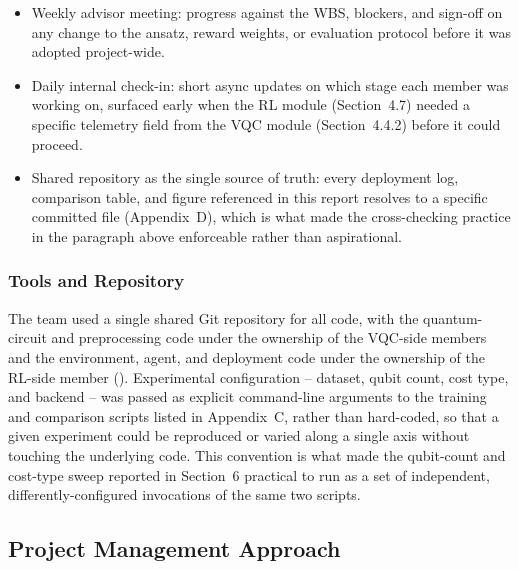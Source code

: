 \begin{itemize}
\item Weekly advisor meeting: progress against the WBS, blockers, and sign-off on any change to the ansatz, reward weights, or evaluation protocol before it was adopted project-wide.
\item Daily internal check-in: short async updates on which stage each member was working on, surfaced early when the RL module (Section~4.7) needed a specific telemetry field from the VQC module (Section~4.4.2) before it could proceed.
\item Shared repository as the single source of truth: every deployment log, comparison table, and figure referenced in this report resolves to a specific committed file (Appendix~D), which is what made the cross-checking practice in the paragraph above enforceable rather than aspirational.
\end{itemize}

\subsubsection{Tools and Repository}
The team used a single shared Git repository for all code, with the quantum-circuit and preprocessing code under the ownership of the VQC-side members and the environment, agent, and deployment code under the ownership of the RL-side member (). Experimental configuration -- dataset, qubit count, cost type, and backend -- was passed as explicit command-line arguments to the training and comparison scripts listed in Appendix~C, rather than hard-coded, so that a given experiment could be reproduced or varied along a single axis without touching the underlying code. This convention is what made the qubit-count and cost-type sweep reported in Section~6 practical to run as a set of independent, differently-configured invocations of the same two scripts.

\subsection{Project Management Approach}
